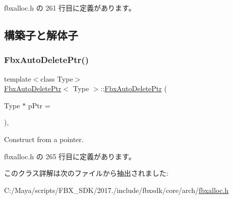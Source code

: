  fbxalloc.\+h の 261 行目に定義があります。



\subsection{構築子と解体子}
\mbox{\label{class_fbx_auto_delete_ptr_af2ecfc69aa5dab398213f6e2275e8289}} 
\subsubsection{\texorpdfstring{Fbx\+Auto\+Delete\+Ptr()}{FbxAutoDeletePtr()}}
{\footnotesize\ttfamily template$<$class Type$>$ \\
\hyperlink{class_fbx_auto_delete_ptr}{Fbx\+Auto\+Delete\+Ptr}$<$ Type $>$\+::\hyperlink{class_fbx_auto_delete_ptr}{Fbx\+Auto\+Delete\+Ptr} (\begin{DoxyParamCaption}\item[{Type $\ast$}]{p\+Ptr = {} }\end{DoxyParamCaption})\hspace{0.3cm}{\ttfamily [inline]}, {\ttfamily [explicit]}}



Construct from a pointer. 



 fbxalloc.\+h の 265 行目に定義があります。



このクラス詳解は次のファイルから抽出されました\+:\begin{DoxyCompactItemize}
\item 
C\+:/\+Maya/scripts/\+F\+B\+X\+\_\+\+S\+D\+K/2017./include/fbxsdk/core/arch/\hyperlink{fbxalloc_8h}{fbxalloc.\+h}\end{DoxyCompactItemize}
